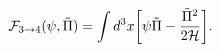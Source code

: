 \begin{equation}
{\cal F}_{3\to 4}(\psi,\tilde{\Pi}) = \int d^{3} x\biggl[\psi \tilde{\Pi} - \frac{\tilde{\Pi}^2}{2 {\cal H}}\biggr].
\end{equation}

